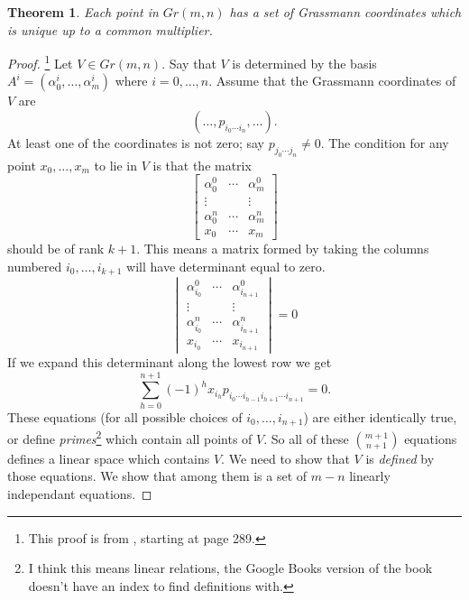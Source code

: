 \documentclass[a4paper,12pt]{book}
\theoremstyle{plain}
\newtheorem{thm}[equation]{Theorem}
\theoremstyle{definition}
\begin{document}
\begin{thm}
	Each point in \( Gr(m,n) \) has a set of Grassmann coordinates which
	is unique up to a common multiplier.
\end{thm}
\begin{proof}
	\footnote{This proof is from \cite{MR0028055},
	starting at page 289. }
	Let \( V \in Gr(m,n) \). Say that \( V \) is determined by the basis
	\( A^i = ( \alpha_0^i, \ldots, \alpha_m^i) \) where
	\( i = 0, \ldots, n \). Assume that the Grassmann coordinates of
	\( V \) are
	\[
		( \ldots, p_{i_0 \cdots i_n}, \ldots).
	\]
	At least one of the coordinates is not zero; say
	\( p_{j_0 \cdots j_n} \not = 0 \). The condition for any point
	\( x_0, \ldots, x_m \) to lie in \( V \) is that the matrix
	\[
		\begin{bmatrix}
			\alpha_0^0 & \cdots & \alpha_m^0 \\
			\vdots & & \vdots \\
			\alpha_0^n & \cdots & \alpha_m^n \\
			x_0 & \cdots & x_m
		\end{bmatrix}
	\]
	should be of rank \( k+1 \).
	This means a matrix formed by taking the columns numbered
	\( i_0, \ldots, i_{k+1} \) will have determinant equal to zero.
	\[
		\begin{vmatrix}
			\alpha_{i_0}^0 & \cdots & \alpha_{i_{n+1}}^0 \\
			\vdots & & \vdots \\
			\alpha_{i_0}^n & \cdots & \alpha_{i_{n+1}}^n \\
			x_{i_0} & \cdots & x_{i_{n+1}}
		\end{vmatrix} = 0
	\]
	If we expand this determinant along the lowest row we get
	\[
		\sum_{h = 0}^{n + 1} (-1)^h x_{i_h}
		p_{i_0 \cdots i_{h-1} i_{h+1} \cdots i_{n+1}} = 0.
	\]
	These equations (for all possible choices of \( i_0, \ldots, i_{n+1} \))
	are either identically true, or define \emph{primes}\footnote{
		I think this means linear relations, the Google Books version
		of the book doesn't have an index to find definitions with.
	} which contain all points of \( V \).
	So all of these \( m+1 \choose n+1 \) equations defines a linear space
	which contains \( V \).
	We need to show that \( V \) is \emph{defined} by those equations.
	We show that among them is a set of \( m-n \) linearly
	independant equations.


\end{proof}
\end{document}
